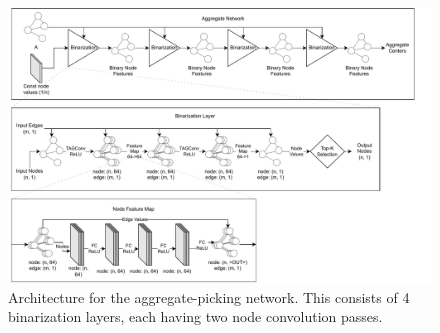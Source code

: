\documentclass{article}
\begin{document}
\begin{figure}[h]
  \centering
  \includegraphics[width=\textwidth]{aggregate.pdf}
  \caption{Architecture for the aggregate-picking network.  This consists of 4 binarization layers, each having two node convolution passes.}
  \label{fig:arch_agg}
\end{figure}
\end{document}
